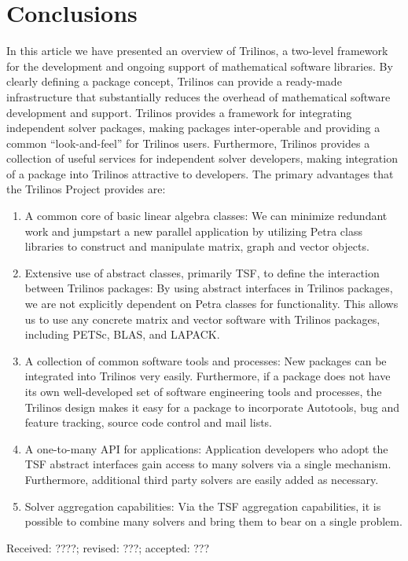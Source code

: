 \documentclass[acmtoms,acmnow]{acmtrans2m}
\newcommand{\bsinglespace}{\renewcommand{\baselinestretch}{1.2}\small\normalsize}
\newcommand{\esinglespace}{}
\begin{document}
\section{Conclusions}

In this article we have presented an overview of Trilinos, a two-level
framework for the development and ongoing support of mathematical
software libraries.  By clearly defining a package concept, Trilinos can
provide a ready-made infrastructure that substantially reduces the overhead of
mathematical software development and support.
Trilinos provides a framework for integrating independent 
solver packages, making packages inter-operable and providing a 
common ``look-and-feel'' 
for Trilinos users.  Furthermore, Trilinos provides a collection 
of useful services for
independent solver developers, making integration of a package into 
Trilinos 
attractive to developers.
The primary advantages that the Trilinos Project provides are:
\begin{enumerate}
\item A common core of basic linear algebra classes:
We can minimize redundant work and jumpstart a new parallel application
by utilizing Petra class libraries to construct 
and manipulate matrix, graph and vector objects.
\item Extensive use of abstract classes, primarily TSF, to define the 
interaction between Trilinos
packages:  By using abstract interfaces in Trilinos packages, we are
not explicitly dependent on Petra classes for functionality.  
This allows us to use any
concrete matrix and vector software with Trilinos packages, 
including PETSc, BLAS, 
and LAPACK.
\item A collection of common software tools and processes: New packages can be 
integrated into Trilinos very easily.  Furthermore, if a package 
does not have its own well-developed set of software engineering tools
and processes, the Trilinos design makes it easy for a package to 
incorporate Autotools, bug and feature tracking,
source code control and mail lists.
\item A one-to-many API for applications: Application developers who 
adopt the TSF abstract interfaces gain access to many solvers via a 
single mechanism.  Furthermore, additional third
party solvers are easily added as necessary.
\item Solver aggregation capabilities:  Via the TSF aggregation 
capabilities, it is possible
to combine many solvers and bring them to bear on a single problem.
\end{enumerate}

{\bsinglespace

\nopagebreak
\scriptsize

\esinglespace}

\begin{received}
Received: ????; revised: ???; accepted: ???
\end{received}
\end{document}
